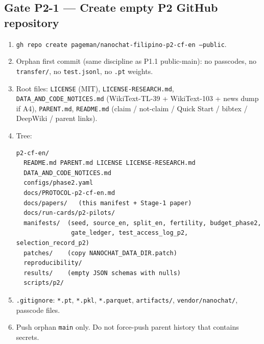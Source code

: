 \documentclass[11pt,a4paper]{article}
\begin{document}
\subsection{Gate P2-1 --- Create empty P2 GitHub repository}
\begin{enumerate}
\item \texttt{gh repo create pageman/nanochat-filipino-p2-cf-en --public}.
\item Orphan first commit (same discipline as P1.1 public-main): no passcodes, no \texttt{transfer/}, no \texttt{test.jsonl}, no \texttt{.pt} weights.
\item Root files: \texttt{LICENSE} (MIT), \texttt{LICENSE-RESEARCH.md}, \texttt{DATA\_AND\_CODE\_NOTICES.md} (WikiText-TL-39 + WikiText-103 + news dump if A4), \texttt{PARENT.md}, \texttt{README.md} (claim / not-claim / Quick Start / bibtex / DeepWiki / parent links).
\item Tree:
\begin{verbatim}
p2-cf-en/
  README.md PARENT.md LICENSE LICENSE-RESEARCH.md
  DATA_AND_CODE_NOTICES.md
  configs/phase2.yaml
  docs/PROTOCOL-p2-cf-en.md
  docs/papers/   (this manifest + Stage-1 paper)
  docs/run-cards/p2-pilots/
  manifests/  (seed, source_en, split_en, fertility, budget_phase2,
               gate_ledger, test_access_log_p2, selection_record_p2)
  patches/    (copy NANOCHAT_DATA_DIR.patch)
  reproducibility/
  results/    (empty JSON schemas with nulls)
  scripts/p2/
\end{verbatim}
\item \texttt{.gitignore}: \texttt{*.pt}, \texttt{*.pkl}, \texttt{*.parquet}, \texttt{artifacts/}, \texttt{vendor/nanochat/}, passcode files.
\item Push orphan \texttt{main} only. Do not force-push parent history that contains secrets.
\end{enumerate}
\end{document}
